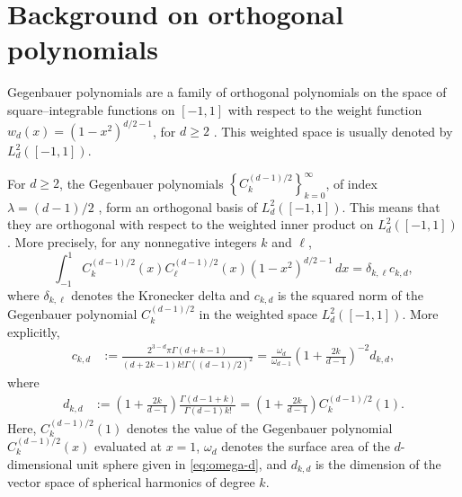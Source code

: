 \documentclass[12pt]{report} %
\begin{document}



\section{Background on orthogonal polynomials} \label{sec:orthogonal}


Gegenbauer polynomials are a family of orthogonal polynomials on the space of square--integrable functions on $[-1,1]$ with respect to the weight function $w_d(x) = (1 - x^2)^{d/2 - 1}$, for $d \geq 2$ \citep[Section~4.7]{Szego1939}. This weighted space is usually denoted by $L_d^2([-1,1])$.  %

For $d \geq 2$, the Gegenbauer polynomials $\left\{C_k^{(d-1)/2}\right\}_{k=0}^{\infty}$, of index $\lambda = (d-1)/2$ \citep[Section~18.3]{NIST:DLMF}, form an orthogonal basis of $L_d^2([-1,1])$. This means that they are orthogonal with respect to the weighted inner product on $L_d^2([-1,1])$. More precisely, for any nonnegative integers $k$ and $\ell$,
\begin{equation*}
    \int_{-1}^{1} C_k^{(d-1)/2}(x) C_\ell^{(d-1)/2}(x)(1 - x^2)^{d/2 - 1}\,dx = \delta_{k,\ell}c_{k,d},\end{equation*}
where $\delta_{k,\ell}$ denotes the Kronecker delta and $c_{k,d}$ is the squared norm of the Gegenbauer polynomial $C_k^{(d-1)/2}$ in the weighted space $L_d^2([-1,1])$. More explicitly,
\begin{equation*}
\begin{aligned}
c_{k,d}
&:= \frac{2^{3-d}\pi \Gamma(d+k-1)}
{(d+2k-1)k!\Gamma((d-1)/2)^2} = \frac{\omega_d}{\omega_{d-1}}
\left(1+\frac{2k}{d-1}\right)^{-2} d_{k,d},
\end{aligned}
\end{equation*}
where
\begin{equation*}
\begin{aligned}
d_{k,d}
&:= \left(1+\frac{2k}{d-1}\right)
\frac{\Gamma(d-1+k)}{\Gamma(d-1)k!} = \left(1+\frac{2k}{d-1}\right) C_k^{(d-1)/2}(1).
\end{aligned}
\end{equation*}
Here, $C_k^{(d-1)/2}(1)$ denotes the value of the Gegenbauer polynomial $C_k^{(d-1)/2}(x)$ evaluated at $x=1$, $\omega_d$ denotes the surface area of the $d$-dimensional unit sphere given in \eqref{eq:omega-d}, and $d_{k,d}$ is the dimension of the vector space of spherical harmonics of degree $k$. 
\end{document}
